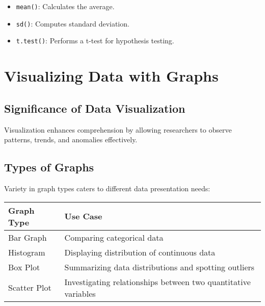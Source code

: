 \documentclass[
  letterpaper,
  DIV=11,
  numbers=noendperiod]{scrreprt}
\providecommand{\tightlist}{%
  \setlength{\itemsep}{0pt}\setlength{\parskip}{0pt}}
\begin{document}
\begin{itemize}
\tightlist
\item
  \texttt{mean()}: Calculates the average.
\item
  \texttt{sd()}: Computes standard deviation.
\item
  \texttt{t.test()}: Performs a t-test for hypothesis testing.
\end{itemize}


\chapter{Visualizing Data with
Graphs}\label{visualizing-data-with-graphs}

\section{Significance of Data
Visualization}\label{significance-of-data-visualization}

Visualization enhances comprehension by allowing researchers to observe
patterns, trends, and anomalies effectively.

\section{Types of Graphs}\label{types-of-graphs}

Variety in graph types caters to different data presentation needs:

\begin{longtable}[]{@{}
  >{\raggedright\arraybackslash}p{}
  >{\raggedright\arraybackslash}p{}@{}}
\toprule\noalign{}
\begin{minipage}[b]{\linewidth}\raggedright
Graph Type
\end{minipage} & \begin{minipage}[b]{\linewidth}\raggedright
Use Case
\end{minipage} \\
\midrule\noalign{}
\endhead
\bottomrule\noalign{}
\endlastfoot
Bar Graph & Comparing categorical data \\
Histogram & Displaying distribution of continuous data \\
Box Plot & Summarizing data distributions and spotting outliers \\
Scatter Plot & Investigating relationships between two quantitative
variables \\
\end{longtable}
\end{document}

